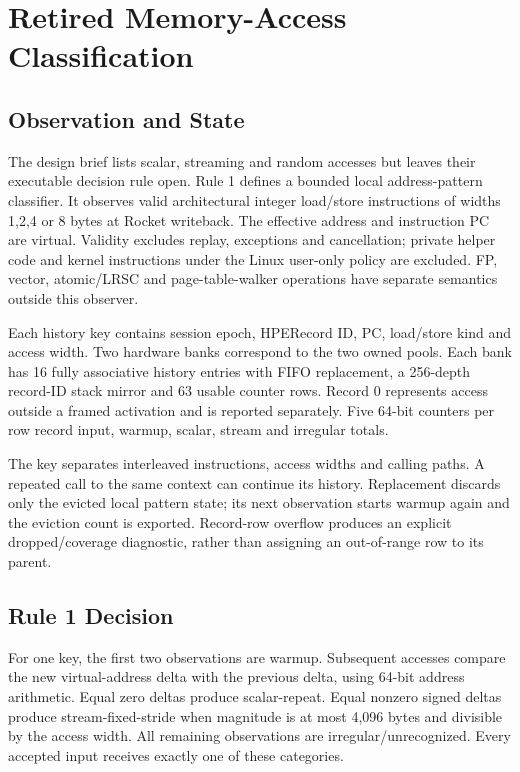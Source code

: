 \section{Retired Memory-Access Classification}
\label{sec:classification}
\subsection{Observation and State}
The design brief lists scalar, streaming and random accesses but leaves their executable decision rule open. Rule 1 defines a bounded local address-pattern classifier. It observes valid architectural integer load/store instructions of widths 1,2,4 or 8 bytes at Rocket writeback. The effective address and instruction PC are virtual. Validity excludes replay, exceptions and cancellation; private helper code and kernel instructions under the Linux user-only policy are excluded. FP, vector, atomic/LRSC and page-table-walker operations have separate semantics outside this observer.

Each history key contains session epoch, HPERecord ID, PC, load/store kind and access width. Two hardware banks correspond to the two owned pools. Each bank has 16 fully associative history entries with FIFO replacement, a 256-depth record-ID stack mirror and 63 usable counter rows. Record 0 represents access outside a framed activation and is reported separately. Five 64-bit counters per row record input, warmup, scalar, stream and irregular totals.

The key separates interleaved instructions, access widths and calling paths. A repeated call to the same context can continue its history. Replacement discards only the evicted local pattern state; its next observation starts warmup again and the eviction count is exported. Record-row overflow produces an explicit dropped/coverage diagnostic, rather than assigning an out-of-range row to its parent.

\subsection{Rule 1 Decision}
For one key, the first two observations are warmup. Subsequent accesses compare the new virtual-address delta with the previous delta, using 64-bit address arithmetic. Equal zero deltas produce scalar-repeat. Equal nonzero signed deltas produce stream-fixed-stride when magnitude is at most 4,096 bytes and divisible by the access width. All remaining observations are irregular/unrecognized. Every accepted input receives exactly one of these categories.

